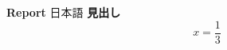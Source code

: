 \documentclass{article}
\begin{document}
\textbf{Report} 日本語 \textbf{見出し} \[x=\frac{1}{3}\]
\end{document}
